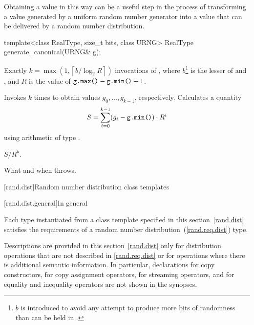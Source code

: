 \pnum
\begin{note}
 Obtaining a value in this way
 can be a useful step
 in the process of transforming
 a value generated by a uniform random number generator
 into a value
 that can be delivered by a random number distribution.
\end{note}

%
\begin{itemdecl}
template<class RealType, size_t bits, class URNG>
 RealType generate_canonical(URNG& g);
\end{itemdecl}

\begin{itemdescr}
\pnum\complexity Exactly
 $ k = \max(1, \left\lceil b / \log_2 R \right\rceil)$
 invocations
 of ,
 where $b$\footnote{$b$ is introduced
   to avoid any attempt
   to produce more bits of randomness
   than can be held in .}
   is the lesser of 
                and ,
 and
   $R$ is the value of $ \texttt{g.max()} - \texttt{g.min()} + 1 $.

\pnum\effects
 Invokes  $k$ times
 to obtain values $ g_0, \ldots, g_{k-1} $, respectively.
 Calculates a quantity
 \[
   S = \sum_{i=0}^{k-1} (g_i - \texttt{g.min()})
                        \cdot R^i
 \]
 using arithmetic of type
 .

\pnum\returns
 $ S / R^k $.

\pnum\throws What and when  throws.
\end{itemdescr}%




[rand.dist]{Random number distribution class templates}%

[rand.dist.general]{In general}

\pnum
Each type instantiated
from a class template specified in this section~\ref{rand.dist}
satisfies the requirements
of a random number distribution~(\ref{rand.req.dist}) type.

\pnum
Descriptions are provided in this section~\ref{rand.dist}
only for distribution operations
that are not described in \ref{rand.req.dist}
or for operations where there is additional semantic information.
In particular,
declarations for copy constructors,
for copy assignment operators,
for streaming operators,
and for equality and inequality operators
are not shown in the synopses.


